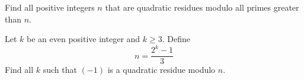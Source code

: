 \documentclass{subfile}
\begin{document}
	\begin{problem}
		Find all positive integers $n$ that are quadratic residues modulo all primes greater than $n$.
	\end{problem}


	\begin{problem}
		Let $k$ be an even positive integer and $k\ge 3$. Define $$n=\frac{2^k-1}{3}$$ Find all $k$ such that $(-1)$ is a quadratic residue modulo $n$.
	\end{problem}

\end{document}
